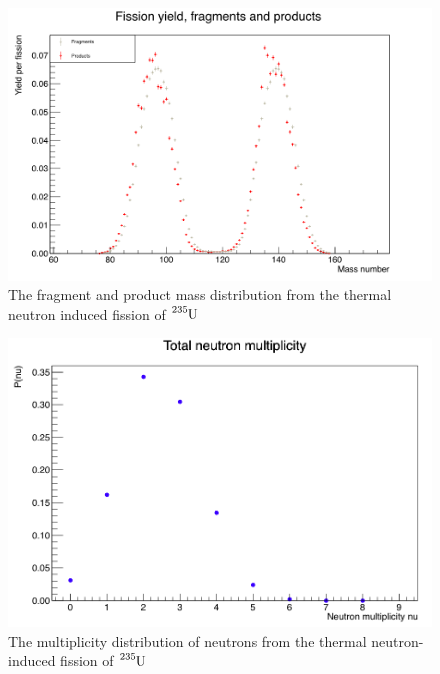 \documentclass[]{article}
\begin{document}
\begin{figure} [H]
	\centering
	\includegraphics[scale=0.36]{U235_fragment_product_distribution.png}
	\caption{The fragment and product mass distribution from the thermal neutron induced fission of $\ce{^{235}U}$}
	\label{fig:U235_fragment_product_distribution}
\end{figure}

\begin{figure} [H]
	\centering
	\includegraphics[scale=0.36]{U235_n_mult.png}
	\caption{The multiplicity distribution of neutrons from the thermal neutron-induced fission of $\ce{^{235}U}$}
	\label{fig:U235_n_mult}
\end{figure}
\end{document}
